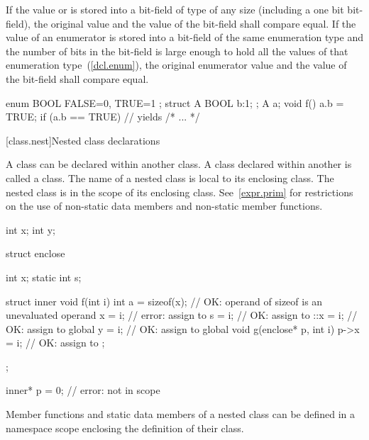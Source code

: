 \pnum
If the value  or  is stored into a bit-field of
type  of any size (including a one bit bit-field), the
original  value and the value of the bit-field shall compare
equal. If the value of an enumerator is stored into a bit-field of the
same enumeration type and the number of bits in the bit-field is large
enough to hold all the values of that enumeration type~(\ref{dcl.enum}),
the original enumerator value and the value of the bit-field shall
compare equal.
\enterexample

\begin{codeblock}
enum BOOL { FALSE=0, TRUE=1 };
struct A {
  BOOL b:1;
};
A a;
void f() {
  a.b = TRUE;
  if (a.b == TRUE)              // yields 
    { /* ... */ }
}
\end{codeblock}
\exitexample

[class.nest]{Nested class declarations}%
%
%

\pnum
A class can be declared within another class. A class declared within
another is called a  class. The name of a nested class
is local to its enclosing class.
%
The nested class is in the scope of its enclosing class.
\enternote
See~\ref{expr.prim} for restrictions on the use of non-static data
members and non-static member functions.
\exitnote

%
\enterexample

\begin{codeblock}
int x;
int y;

struct enclose {
  int x;
  static int s;

  struct inner {
    void f(int i) {
      int a = sizeof(x);        // OK: operand of sizeof is an unevaluated operand
      x = i;                    // error: assign to 
      s = i;                    // OK: assign to 
      ::x = i;                  // OK: assign to global 
      y = i;                    // OK: assign to global 
    }
    void g(enclose* p, int i) {
      p->x = i;                 // OK: assign to 
    }
  };
};

inner* p = 0;                   // error:  not in scope
\end{codeblock}
\exitexample

\pnum
Member functions and static data members of a nested class can be
defined in a namespace scope enclosing the definition of their class.
%
\enterexample


